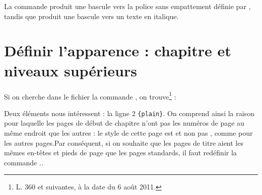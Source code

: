 \begin{latexcode}
\makeatletter
\renewcommand\section{\@startsection {section}{1}{\z@}%
                             {-3.5ex \@plus -1ex \@minus -.2ex}%
                             {2.3ex \@plus.2ex}%
                             {\sffamily\Large\it}}
\makeatother
\end{latexcode}

La commande  produit une bascule vers la police sans empattement définie par , tandis que  produit une bascule vers un texte en italique.

\section{Définir l'apparence : chapitre et niveaux supérieurs}

Si on cherche dans le fichier  la commande , on trouve\footnote{L. 360 et suivantes, à la date du 6 août 2011.} :

\begin{latexcode}
\newcommand\chapter{\if@openright\cleardoublepage\else\clearpage\fi
                    \thispagestyle{plain}%
                    \global\@topnum\z@
                    \@afterindentfalse
                    \secdef\@chapter\@schapter}
\end{latexcode}

Deux éléments nous intéressent : la ligne 2 \verb|{plain}|. On comprend ainsi la raison pour laquelle les  pages de début de chapitre n'ont pas les numéros de  page au même endroit que les autres : le style de cette page est  et non pas , comme pour les autres pages.Par conséquent, si on souhaite que les pages de titre aient les mêmes en-têtes et pieds de page que les pages standards, il faut redéfinir la commande .\label{entetechapter}.\label{chapitrepagestyle}

\begin{latexcode}
\makeatletter
\renewcommand\chapter{\if@openright\cleardoublepage%
                    \else\clearpage\fi
                    \global\@topnum\z@
                    \@afterindentfalse
                    \secdef\@chapter\@schapter}
\makeatother
\end{latexcode}

